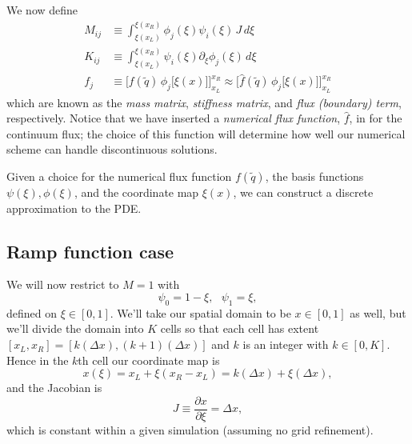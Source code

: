 \documentclass[12pt]{article}
\numberwithin{equation}{section}
\begin{document}
We now define
\begin{equation}
\begin{aligned}
M_{ij} &\equiv \int_{\xi(x_L)}^{\xi(x_R)} \phi_j(\xi) \psi_i(\xi) \, J \, d\xi \\
K_{ij} &\equiv \int_{\xi(x_L)}^{\xi(x_R)} \psi_i(\xi) \partial_\xi \phi_j(\xi) \, d \xi \\
f_j    &\equiv \Big[ f(\tilde{q}) \, \phi_j\big[ \xi(x) \big] \Big]^{x_R}_{x_L} \approx \Big[ \hat{f}(\tilde{q}) \, \phi_j\big[ \xi(x) \big] \Big]^{x_R}_{x_L}
\end{aligned}
\end{equation}
which are known as the \textit{mass matrix}, \textit{stiffness matrix}, and \textit{flux (boundary) term}, respectively. 
Notice that we have inserted a \textit{numerical flux function}, $\hat{f}$, in for the continuum flux; the choice of this function will determine how well our numerical scheme can handle discontinuous solutions.

Given a choice for the numerical flux function $f(\tilde{q})$, the basis functions $\psi(\xi), \phi(\xi)$, and the coordinate map $\xi(x)$, we can construct a discrete approximation to the PDE.

\clearpage

\subsection{Ramp function case}

We will now restrict to $M = 1$ with
\begin{equation}
\psi_0 = 1 - \xi, ~~~ \psi_1 = \xi,
\end{equation}
defined on $\xi \in [0,1]$.
We'll take our spatial domain to be $x \in [0, 1]$ as well, but we'll divide the domain into $K$ cells so that each cell has extent $[x_L, x_R] = [k (\Delta x), (k+1) (\Delta x)]$ and $k$ is an integer with $k \in [0,K]$.
Hence in the $k$th cell our coordinate map is
\begin{equation}
x(\xi) = x_L + \xi (x_R - x_L) = k (\Delta x) + \xi (\Delta x),
\end{equation}
and the Jacobian is
\begin{equation}
J \equiv \frac{\partial x}{\partial \xi} = \Delta x,
\end{equation}
which is constant within a given simulation (assuming no grid refinement).
\end{document}
